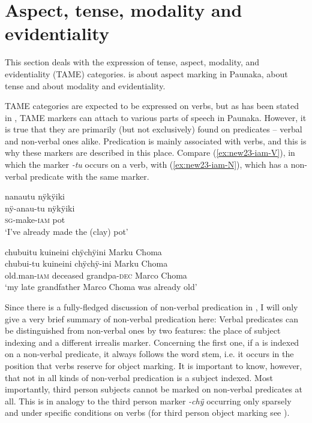 \section{Aspect, tense, modality and evidentiality}\label{sec:OperationsPredicates}

This section deals with the expression of tense,  aspect, modality, and evidentiality (TAME) categories.  is about aspect marking in Paunaka,  about tense and  about modality and evidentiality. 

TAME categories are expected to be expressed on verbs, but as has been stated in , TAME markers can attach to various parts of speech in Paunaka. However, it is true that they are primarily (but not exclusively) found on predicates -- verbal and non-verbal ones alike. Predication is mainly associated with verbs, and this is why these markers are described in this place. Compare (\ref{ex:new23-iam-V}), in which the  marker \textit{-tu} occurs on a verb, with (\ref{ex:new23-iam-N}), which has a non-verbal predicate with the same  marker.

\ea\label{ex:new23-iam-V}
\begingl
\glpreamble nanautu nÿkÿiki\\
\gla nÿ-anau-tu nÿkÿiki\\
\textsc{sg}-make-\textsc{iam} pot\\
\glft ‘I’ve already made the (clay) pot’
\endgl
\trailingcitation{[jxx-d110923l-1.03]}
\xe

\ea\label{ex:new23-iam-N}
\begingl
\glpreamble chubuitu kuineini chÿchÿini Marku Choma\\
\gla chubui-tu kuineini chÿchÿ-ini {Marku Choma}\\
\glb old.man-\textsc{iam} deceased grandpa-\textsc{dec} {Marco Choma}\\
\glft ‘my late grandfather Marco Choma was already old’
\endgl
\trailingcitation{[mxx-p110825l.023]}
\xe

Since there is a fully-fledged discussion of non-verbal predication in , I will only give a very brief summary of non-verbal predication here: Verbal predicates can be distinguished from non-verbal ones by two features: the place of subject indexing and a different irrealis marker. Concerning the first one, if a  is indexed on a non-verbal predicate, it always follows the word stem, i.e. it occurs in the position that verbs reserve for object marking. It is important to know, however, that not in all kinds of non-verbal predication is a subject indexed. Most importantly, third person subjects cannot be marked on non-verbal predicates at all. This is in analogy to the third person marker \textit{-chÿ} occurring only sparsely and under specific conditions on verbs (for third person object marking see ). 

